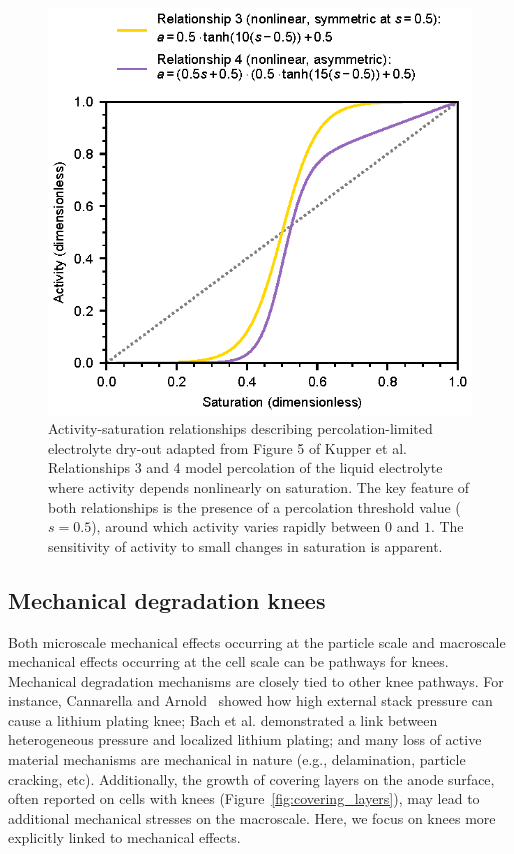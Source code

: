 \documentclass[journal=jpcl, manuscript=article, layout=onecolumn]{achemso}
\begin{document}
\begin{figure}[ht]
    \centering
    \includegraphics[scale=1.0]{figures/percolation.eps}
    \caption{Activity-saturation relationships describing percolation-limited electrolyte dry-out adapted from Figure 5 of Kupper et al.\cite{kupper_end--life_2018} Relationships 3 and 4 model percolation of the liquid electrolyte where activity depends nonlinearly on saturation. The key feature of both relationships is the presence of a percolation threshold value ($s=0.5$), around which activity varies rapidly between $0$ and $1$.
    The sensitivity of activity to small changes in saturation is apparent.}
    \label{fig:percolation}
\end{figure}

\subsection{Mechanical degradation knees}

Both microscale mechanical effects occurring at the particle scale and macroscale mechanical effects occurring at the cell scale can be pathways for knees.
Mechanical degradation mechanisms are closely tied to other knee pathways. For instance, Cannarella and Arnold~\cite{cannarella_stress_2014} showed how high external stack pressure can cause a lithium plating knee; Bach et al.\cite{bach_nonlinear_2016} demonstrated a link between heterogeneous pressure and localized lithium plating; and many loss of active material mechanisms are mechanical in nature (e.g., delamination, particle cracking, etc).
Additionally, the growth of covering layers on the anode surface, often reported on cells with knees (Figure~\ref{fig:covering_layers}), \cite{lewerenz_post-mortem_2017,willenberg_development_2020,stiaszny_electrochemical_2014} may lead to additional mechanical stresses on the macroscale.
Here, we focus on knees more explicitly linked to mechanical effects.
\end{document}
